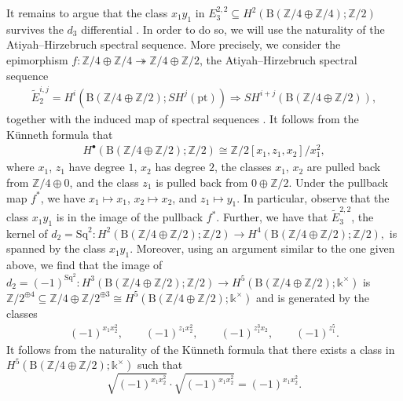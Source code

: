 \documentclass[pdftex]{sigma}
\numberwithin{equation}{section}
\begin{document}
It remains to argue that the class $x_1y_1$ in $E_3^{2,2}\subseteq H^2(\mathrm{B}(\mathbb{Z}/4\oplus\mathbb{Z}/4);\mathbb{Z}/2)$ survives the $d_3$ differential . In order to do so, we will use the naturality of the Atiyah--Hirzebruch spectral sequence. More precisely, we consider the epimorphism $f\colon \mathbb{Z}/4\oplus\mathbb{Z}/4\twoheadrightarrow \mathbb{Z}/4\oplus\mathbb{Z}/2$, the Atiyah--Hirzebruch spectral sequence
 \begin{gather*}
\widetilde{E}^{i,j}_2=H^i(\mathrm{B}(\mathbb{Z}/4\oplus \mathbb{Z}/2);SH^j(\mathrm{pt}))\Rightarrow SH^{i+j}(\mathrm{B}(\mathbb{Z}/4\oplus \mathbb{Z}/2)),
\end{gather*}
 together with the induced map of spectral sequences . It follows from the K\"unneth formula that
 \begin{gather*}
 H^{\bullet}(\mathrm{B}(\mathbb{Z}/4\oplus\mathbb{Z}/2);\mathbb{Z}/2)\cong \mathbb{Z}/2[x_1,z_1,x_2]/x_1^2,
 \end{gather*}
 where $x_1$, $z_1$ have degree $1$, $x_2$ has degree $2$, the classes $x_1$, $x_2$ are pulled back from $\mathbb{Z}/4\oplus 0$, and the class $z_1$ is pulled back from $0\oplus \mathbb{Z}/2$. Under the pullback map $f^*$, we have $x_1\mapsto x_1$, $x_2\mapsto x_2$, and $z_1\mapsto y_1$. In particular, observe that the class $x_1y_1$ is in the image of the pullback $f^*$. Further, we have that $\widetilde{E}_3^{2,2}$, the kernel of $d_2=\mathrm{Sq}^2\colon H^2(\mathrm{B}(\mathbb{Z}/4\oplus\mathbb{Z}/2);\mathbb{Z}/2)\rightarrow H^4(\mathrm{B}(\mathbb{Z}/4\oplus\mathbb{Z}/2);\mathbb{Z}/2),$ is spanned by the class $x_1y_1$. Moreover, using an argument similar to the one given above, we find that the image of $d_2=(-1)^{\mathrm{Sq}^2}\colon H^3(\mathrm{B}(\mathbb{Z}/4\oplus\mathbb{Z}/2);\mathbb{Z}/2)\rightarrow H^5(\mathrm{B}(\mathbb{Z}/4\oplus\mathbb{Z}/2);\mathds{k}^{\times})$ is~$\mathbb{Z}/2^{\oplus 4}\subseteq \mathbb{Z}/4\oplus\mathbb{Z}/2^{\oplus 3}\cong H^5(\mathrm{B}(\mathbb{Z}/4\oplus\mathbb{Z}/2);\mathds{k}^{\times})$ and is generated by the classes \begin{gather*}
 (-1)^{x_1x_2^2},\qquad (-1)^{z_1x_2^2},\qquad (-1)^{z_1^3x_2},\qquad (-1)^{z_1^5}.
 \end{gather*}
 It follows from the naturality of the K\"unneth formula that there exists a class  in $H^5(\mathrm{B}(\mathbb{Z}/4\oplus\mathbb{Z}/2);\mathds{k}^{\times})$ such that
 \[
 \sqrt{(-1)^{x_1x_2^2}}\cdot \sqrt{(-1)^{x_1x_2^2}} = (-1)^{x_1x_2^2}.
 \]
\end{document}
